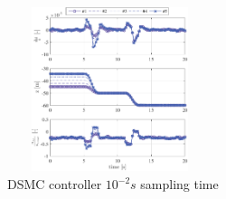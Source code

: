 \documentclass{ifacconf}
\newcommand{\figheight}{4.8cm}
\newcommand{\figwidth}{6cm}
\begin{document}
\begin{figure}[h!]
\begin{center}
\includegraphics[width=\figwidth,height=\figheight]{DSMC-100Hz-TIMESCALESEPARATION-turbulence=1}    %
\caption{ DSMC controller $10^{-2} s$ sampling time}
\label{fig:DSMC100Hz}
\end{center}
\end{figure}
\end{document}
